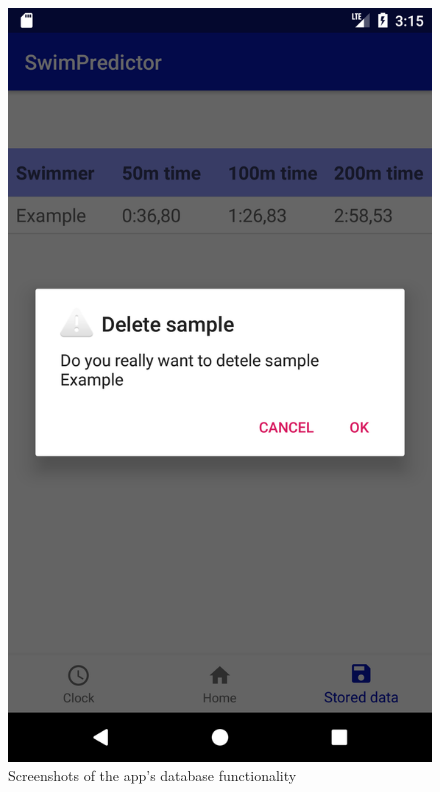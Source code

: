 \begin{figure}[ht]
\begin{minipage}{0.15\textwidth}
\includegraphics[width=\textwidth]{visualisation/app_confirm_deletion.png}
\end{minipage}
\caption{Screenshots of the app's database functionality}
\label{fig:app_screenshots_database}
\end{figure}